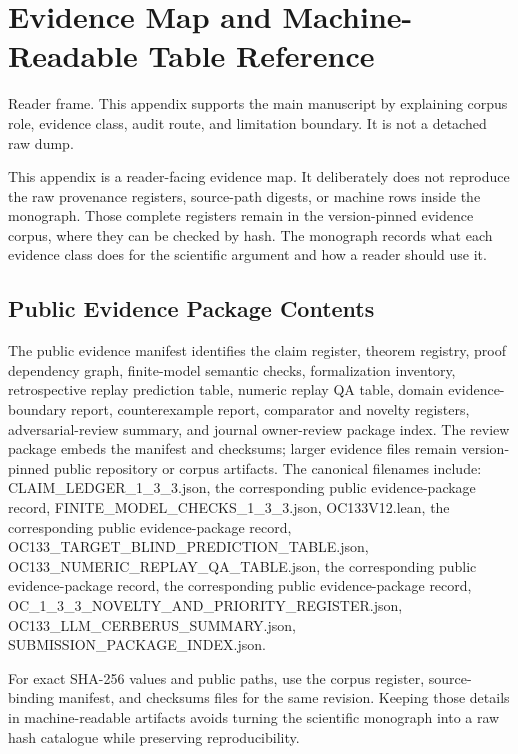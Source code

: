 \section{Evidence Map and Machine-Readable Table Reference}
Reader frame. This appendix supports the main manuscript by explaining corpus role, evidence class, audit route, and limitation boundary. It is not a detached raw dump.


\label{app:oc133-source-to-pdf-trace}

This appendix is a reader-facing evidence map. It deliberately does not reproduce the raw provenance registers, source-path digests, or machine rows inside the monograph. Those complete registers remain in the version-pinned evidence corpus, where they can be checked by hash. The monograph records what each evidence class does for the scientific argument and how a reader should use it.


\subsection{Public Evidence Package Contents}

The public evidence manifest identifies the claim register, theorem registry, proof dependency graph, finite-model semantic checks, formalization inventory, retrospective replay prediction table, numeric replay QA table, domain evidence-boundary report, counterexample report, comparator and novelty registers, adversarial-review summary, and journal owner-review package index. The review package embeds the manifest and checksums; larger evidence files remain version-pinned public repository or corpus artifacts. The canonical filenames include: CLAIM\_LEDGER\_1\_3\_3.json, the corresponding public evidence-package record, FINITE\_MODEL\_CHECKS\_1\_3\_3.json, OC133V12.lean, the corresponding public evidence-package record, OC133\_TARGET\_BLIND\_PREDICTION\_TABLE.json, OC133\_NUMERIC\_REPLAY\_QA\_TABLE.json, the corresponding public evidence-package record, the corresponding public evidence-package record, OC\_1\_3\_3\_NOVELTY\_AND\_PRIORITY\_REGISTER.json, OC133\_LLM\_CERBERUS\_SUMMARY.json, SUBMISSION\_PACKAGE\_INDEX.json.


For exact SHA-256 values and public paths, use the corpus register, source-binding manifest, and checksums files for the same revision. Keeping those details in machine-readable artifacts avoids turning the scientific monograph into a raw hash catalogue while preserving reproducibility.


